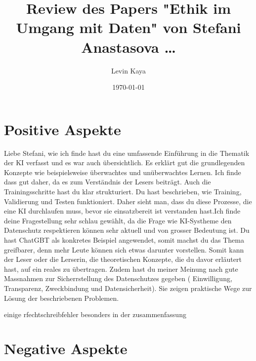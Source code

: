 \documentclass{article}
\title{Review des Papers "Ethik im Umgang mit Daten" von Stefani Anastasova \dots}
\author{Levin Kaya}
\date{\today}
\begin{document}
\maketitle




\section{Positive Aspekte}
Liebe Stefani, wie ich finde hast du eine umfassende Einführung in die Thematik der KI verfasst und es war auch übersichtlich. Es erklärt gut die grundlegenden Konzepte wie beispielsweise überwachtes und unüberwachtes Lernen. Ich finde dass gut daher, da es zum Verständnis der Lesers beiträgt.
Auch die Trainingsschritte hast du klar strukturiert. Du hast beschrieben, wie Training, Validierung und Testen funktioniert. Daher sieht man, dass du diese Prozesse, die eine KI durchlaufen muss, bevor sie einsatzbereit ist verstanden hast.Ich finde deine Fragestellung sehr schlau gewählt, da die Frage wie KI-Systheme den Datenschutz respektieren können sehr aktuell und von grosser Bedeutung ist. Du hast ChatGBT als konkretes Beispiel angewendet, somit machst du das Thema greifbarer, denn mehr Leute können sich etwas darunter vorstellen. Somit kann der Leser oder die Lerserin, die theoretischen Konzepte, die du davor erläutert hast, auf ein reales zu übertragen. Zudem hast du meiner Meinung nach gute Massnahmen zur Sicherrstellung des Datenschutzes gegeben ( Einwilligung, Transparenz, Zweckbindung und Datensicherheit). Sie zeigen praktische Wege zur Lösung der beschriebenen Problemen.

einige rfechtschreibfehler besonders in der zusammenfassung

\section{Negative Aspekte}
\end{document}
